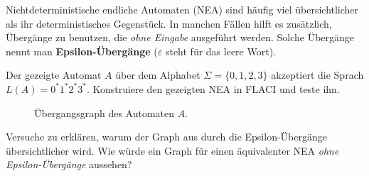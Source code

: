 \documentclass[fontsize=11pt, a4paper, ngerman]{scrartcl}
\begin{document}
\ReiheTitel

Nichtdeterministische endliche Automaten (NEA) sind häufig viel übersichtlicher als
ihr deterministisches Gegenstück. In manchen Fällen hilft es zusätzlich, Übergänge
zu benutzen, die \emph{ohne Eingabe} ausgeführt werden. Solche Übergänge nennt man
\textbf{Epsilon-Übergänge} ($\varepsilon$ steht für das leere Wort).

\begin{aufgabe}
	\label{aufg:graph-1}
	Der gezeigte Automat $A$ über dem Alphabet $\Sigma = \{0,1,2,3\}$ akzeptiert
	die Sprach $L(A) = 0^{*}1^\ast2^\ast3^\ast$. Konstruiere den gezeigten NEA
	in FLACI und teste ihn.

	\begin{figure}[h]
	    \centering
	    \begin{transitiongraph}[fa]
	    \end{transitiongraph}
	    \caption{Übergangsgraph des Automaten $A$.}
	    \label{abb:graph_1}
	\end{figure}
\end{aufgabe}

\begin{aufgabe}
	\label{aufg:graph-2}
	Versuche zu erklären, warum der Graph aus  durch die
	Epsilon-Übergänge übersichtlicher wird. Wie würde ein Graph für einen äquivalenter
	NEA \emph{ohne Epsilon-Übergänge} aussehen?

\end{aufgabe}
\end{document}
